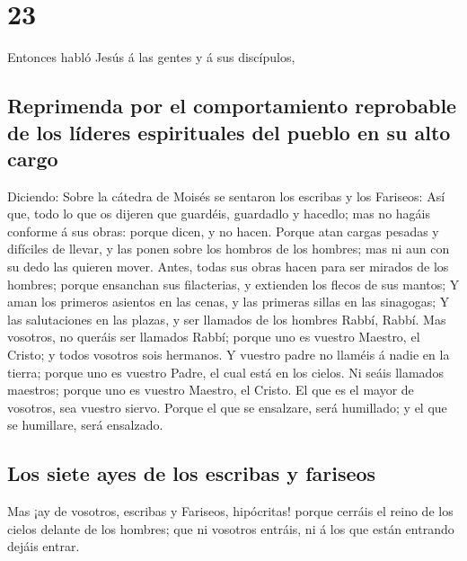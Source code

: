 \hypertarget{section-40-23}{%
\section{23}\label{section-40-23}}

 Entonces habló Jesús á las gentes y á sus discípulos,

\hypertarget{reprimenda-por-el-comportamiento-reprobable-de-los-luxedderes-espirituales-del-pueblo-en-su-alto-cargo}{%
\subsection{Reprimenda por el comportamiento reprobable de los líderes
espirituales del pueblo en su alto
cargo}\label{reprimenda-por-el-comportamiento-reprobable-de-los-luxedderes-espirituales-del-pueblo-en-su-alto-cargo}}

 Diciendo: Sobre la cátedra de Moisés se sentaron los
escribas y los Fariseos:  Así que, todo lo que os dijeren
que guardéis, guardadlo y hacedlo; mas no hagáis conforme á sus obras:
porque dicen, y no hacen.  Porque atan cargas pesadas y
difíciles de llevar, y las ponen sobre los hombros de los hombres; mas
ni aun con su dedo las quieren mover.  Antes, todas sus
obras hacen para ser mirados de los hombres; porque ensanchan sus
filacterias, y extienden los flecos de sus mantos;  Y aman
los primeros asientos en las cenas, y las primeras sillas en las
sinagogas;  Y las salutaciones en las plazas, y ser
llamados de los hombres Rabbí, Rabbí.  Mas vosotros, no
queráis ser llamados Rabbí; porque uno es vuestro Maestro, el Cristo; y
todos vosotros sois hermanos.  Y vuestro padre no llaméis
á nadie en la tierra; porque uno es vuestro Padre, el cual está en los
cielos.  Ni seáis llamados maestros; porque uno es
vuestro Maestro, el Cristo.  El que es el mayor de
vosotros, sea vuestro siervo.  Porque el que se
ensalzare, será humillado; y el que se humillare, será ensalzado.

\hypertarget{los-siete-ayes-de-los-escribas-y-fariseos}{%
\subsection{Los siete ayes de los escribas y
fariseos}\label{los-siete-ayes-de-los-escribas-y-fariseos}}

 Mas ¡ay de vosotros, escribas y Fariseos, hipócritas!
porque cerráis el reino de los cielos delante de los hombres; que ni
vosotros entráis, ni á los que están entrando dejáis entrar.

